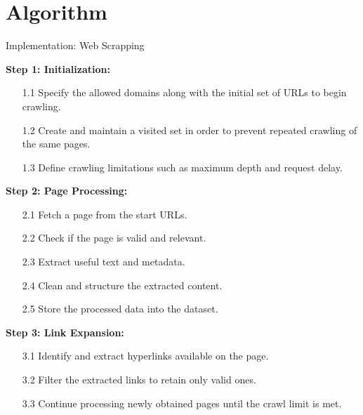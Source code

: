 \section{Algorithm}
\begin{frame}{Implementation: Web Scrapping}
  
        \textbf{Step 1: Initialization:}
            \begin{itemize}
                \item[1.1] Specify the allowed domains along with the initial set of URLs to begin crawling.
                \item[1.2] Create and maintain a visited set in order to prevent repeated crawling of the same pages.
                \item[1.3] Define crawling limitations such as maximum depth and request delay.
            \end{itemize}
            
        
        \textbf{Step 2: Page Processing:}
            \begin{itemize}
            
                \item[2.1] Fetch a page from the start URLs.
                \item[2.2] Check if the page is valid and relevant.
                \item[2.3] Extract useful text and metadata.
                \item[2.4] Clean and structure the extracted content.
                \item[2.5] Store the processed data into the dataset.
            \end{itemize}
        
        \textbf{Step 3: Link Expansion:}
            \begin{itemize}
                \item[3.1] Identify and extract hyperlinks available on the page.
                \item[3.2] Filter the extracted links to retain only valid ones.
                \item[3.3] Continue processing newly obtained pages until the crawl limit is met.
            \end{itemize}
    
   
\end{frame}

